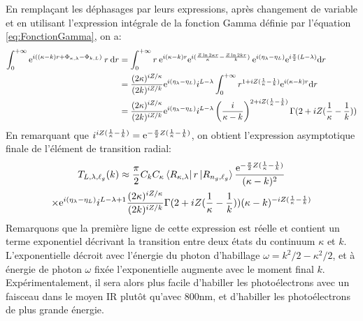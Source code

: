En remplaçant les déphasages par leurs expressions, après changement de variable et en utilisant l'expression intégrale de la fonction Gamma définie par l'équation \ref{eq:FonctionGamma}, on a:
\begin{align}
\int_{0}^{+ \infty} \mathrm{e}^{i((\kappa - k) r + \Phi_{\kappa,\lambda} - \Phi_{k,L})} \: r \: \mathrm{d} r & = \int_{0}^{+ \infty} r \: \mathrm{e}^{i(\kappa-k)r} \mathrm{e}^{i(\frac{Z \ln 2 \kappa r}{\kappa } - \frac{Z \ln 2 k r}{k})} \: \mathrm{e}^{i(\eta_\lambda - \eta_L)} \mathrm{e}^{i\frac{\pi}{2}(L - \lambda)} \mathrm{d} r \\
& = \frac{(2\kappa)^{iZ/\kappa}}{(2k)^{iZ/k}} \mathrm{e}^{i(\eta_\lambda - \eta_L)} i^{L-\lambda} \int_{0}^{+ \infty} r^{1+iZ(\frac{1}{\kappa}-\frac{1}{k})} \mathrm{e}^{i(\kappa-k)r} \mathrm{d} r \\
& = \frac{(2\kappa)^{iZ/\kappa}}{(2k)^{iZ/k}} \mathrm{e}^{i(\eta_\lambda - \eta_L)} i^{L-\lambda} \left( \frac{i}{\kappa-k} \right)^{2+iZ(\frac{1}{\kappa}-\frac{1}{k})} \Gamma(2+iZ(\frac{1}{\kappa}-\frac{1}{k}))
\end{align}
En remarquant que $i^{iZ(\frac{1}{\kappa}-\frac{1}{k})} = \mathrm{e}^{-\frac{\pi}{2}Z(\frac{1}{\kappa}-\frac{1}{k})}$, on obtient l'expression asymptotique finale de l'élément de transition radial:
\begin{multline}
T_{L,\lambda,\ell_g}(k) \approx \frac{\pi}{2} C_k C_\kappa \bra{R_{\kappa,\lambda}} r \ket{R_{n_g,\ell_g}} \frac{\mathrm{e}^{-\frac{\pi}{2}Z(\frac{1}{\kappa}-\frac{1}{k})}}{(\kappa - k)^2} \\ \times \mathrm{e}^{i(\eta_\lambda - \eta_L)} i^{L-\lambda +1} \frac{(2\kappa)^{iZ/\kappa}}{(2k)^{iZ/k}} \Gamma(2+iZ(\frac{1}{\kappa}-\frac{1}{k})) (\kappa - k)^{-iZ(\frac{1}{\kappa}-\frac{1}{k})}
\end{multline}
Remarquons que la première ligne de cette expression est réelle et contient un terme exponentiel décrivant la transition entre deux états du continuum $\kappa$ et $k$. L'exponentielle décroit avec l'énergie du photon d'habillage $\omega = k^2 / 2 - \kappa^2/2$, et à énergie de photon $\omega$ fixée l'exponentielle augmente avec le moment final $k$. Expérimentalement, il sera alors plus facile d'habiller les photoélectrons avec un faisceau dans le moyen IR plutôt qu'avec 800nm, et d'habiller les photoélectrons de plus grande énergie.

